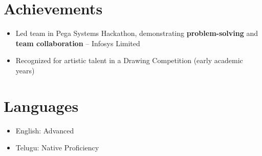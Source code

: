 \documentclass[article,11pt]{article}
\newcommand{\resumeItem}[1]{\item\small{#1}}
\newcommand{\resumeSubHeadingListStart}{\begin{itemize}[leftmargin=0.15in, label={}]}
\newcommand{\resumeSubHeadingListEnd}{\end{itemize}}
\begin{document}
\section{Achievements}
\resumeSubHeadingListStart
    \resumeItem{Led team in Pega Systems Hackathon, demonstrating \textbf{problem-solving} and \textbf{team collaboration} – Infosys Limited}
    \resumeItem{Recognized for artistic talent in a Drawing Competition (early academic years)}
\resumeSubHeadingListEnd

\section{Languages}
\resumeSubHeadingListStart
    \resumeItem{English: Advanced}
    \resumeItem{Telugu: Native Proficiency}
\resumeSubHeadingListEnd
\end{document}

